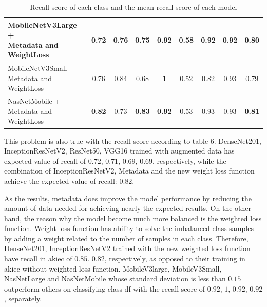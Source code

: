 \documentclass[sensors,article,submit,pdftex,moreauthors]{Definitions/mdpi}
\begin{document}
\begin{table}[h]
\begin{tabular}{|l | c | c | c | c | c | c | c | c|}
		\hline
		\thead{MobileNetV3Large +\\Metadata and WeightLoss} & 0.72 & 0.76 & 0.75 & \textbf{0.92} & 0.58 & 0.92 & 0.92 & \textbf{0.80}\\
		\hline
		\thead{MobileNetV3Small +\\Metadata and WeightLoss} & 0.76 & 0.84 & 0.68 & \textbf{1} & 0.52 & 0.82 & 0.93 & 0.79\\
		\hline
		\thead{NasNetMobile +\\Metadata and WeightLoss} & \textbf{0.82} & 0.73 & \textbf{0.83} & \textbf{0.92} & 0.53 & 0.93 & 0.93 & \textbf{0.81}\\
		\hline
	\end{tabular}
	\caption{Recall score of each class and the mean recall score of each model}
	\label{table:6}
\end{table}

This problem is also true with the recall score according to table 6. DenseNet201, InceptionResNetV2, ResNet50, VGG16 trained with augmented data has expected value of recall of $0.72$, $0.71$, $0.69$, $0.69$, respectively, while the combination of InceptionResNetV2, Metadata and the new weight loss function achieve the expected value of recall: $0.82$.

As the results, metadata does improve the model performance by reducing the amount of data needed for achieving nearly the expected results. On the other hand, the reason why the model become much more balanced is the weighted loss function. Weight loss function has ability to solve the imbalanced class samples by adding a weight related to the number of samples in each class. Therefore, DenseNet201, InceptionResNetV2 trained with the new weighted loss function have recall in akiec of $0.85$. $0.82$, respectively, as opposed to their training in akiec without weighted loss function. MobileV3large, MobileV3Small, NasNetLarge and NasNetMobile whose standard deviation is less than $0.15$ outperform others on classifying class df with the recall score of $0.92$, $1$, $0.92$, $0.92$, separately.
\end{document}
